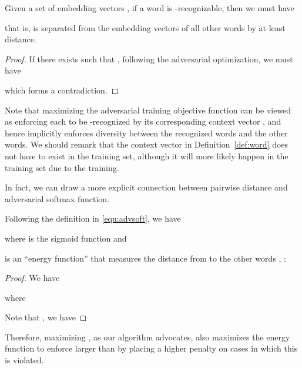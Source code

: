 \documentclass{article}
\begin{document}
\begin{thm}
\label{thm:diversity}
Given a set of embedding vectors , 
 if a word  is -recognizable, then we must have 

that is, 
 is separated from the embedding vectors of all other words by at least  distance. 
\end{thm}
\begin{proof}
If there exists  such that , 
following the adversarial optimization, we must have 

which forms a contradiction. 
\end{proof}
Note that maximizing the adversarial training objective function 
can be viewed as enforcing each  to be -recognized by 
its corresponding context vector , and hence implicitly enforces diversity between the recognized words and the other words.   
We should remark that the context vector  in Definition~\ref{def:word} does not have to exist in the training set, although it will more likely happen in the training set due to the training. 
 
In fact, we can draw a more explicit connection between pairwise distance and adversarial softmax function. \begin{thm} 
Following the definition in \eqref{equ:advsoft}, we have  

where  is the sigmoid function and 

is an ``energy function''
that measures the distance from  to the other words , : 

\label{thm:diversity}
\end{thm}
\vspace{-3em}
\begin{proof}
We have 

where 

Note that , we have

\vspace{-1.0em}
\iffalse 
Assume , we have 

This is equivalent to 

Further

Define . We have 

This shows that 

\fi 
\end{proof}
\vspace{-0.5em}

Therefore, maximizing 
, as our algorithm advocates, 
also maximizes the energy function  to enforce  larger than  by placing a higher penalty 
on cases in which this is violated. 
\end{document}

